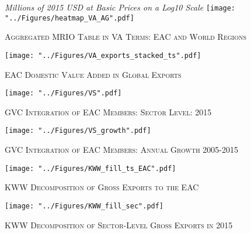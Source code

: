 \documentclass[a4paper]{article}
\begin{document}
\begin{figure}[h!]
\centering
\caption{\label{fig:VAwld}\textsc{Aggregated MRIO Table in VA Terms: EAC and World Regions}}
\small{\textit{Millions of 2015 USD at Basic Prices on a Log10 Scale}}
\texttt{[image: "../Figures/heatmap\_VA\_AG".pdf]} %
\end{figure}
\FloatBarrier

\begin{figure}[h!]
\centering
\caption{\label{fig:VAexp}\textsc{EAC Domestic Value Added in Global Exports}}
\texttt{[image: "../Figures/VA\_exports\_stacked\_ts".pdf]} %
\end{figure}
\FloatBarrier

\begin{figure}[h!]
\centering
\caption{\label{fig:VS}\textsc{GVC Integration of EAC Members: Sector Level: 2015}}
\texttt{[image: "../Figures/VS".pdf]} %
\end{figure}
\FloatBarrier

\begin{figure}[h!]
\centering
\caption{\label{fig:VSgr}\textsc{GVC Integration of EAC Members: Annual Growth 2005-2015}}
\texttt{[image: "../Figures/VS\_growth".pdf]} %
\end{figure}
\FloatBarrier


\begin{figure}[h!] \vspace{-1cm}
\centering
\caption{\label{fig:KWW_fill_ts_EAC}\textsc{KWW Decomposition of Gross Exports to the EAC}}
\texttt{[image: "../Figures/KWW\_fill\_ts\_EAC".pdf]} %
\vspace{-0.8cm}
\end{figure}
\FloatBarrier

\begin{figure}[h!] \vspace{-0.1cm}
\centering
\caption{\label{fig:KWW_fill_sec}\textsc{KWW Decomposition of Sector-Level Gross Exports in 2015}}
\texttt{[image: "../Figures/KWW\_fill\_sec".pdf]} %
\vspace{-1.5cm}
\end{figure}
\FloatBarrier
\end{document}
